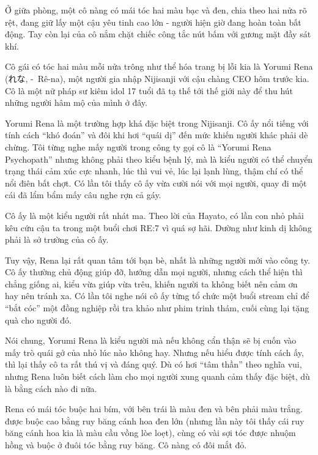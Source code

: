 \documentclass[../main.tex]{subfiles}
\begin{document}
Ở giữa phòng, một cô nàng có mái tóc hai màu bạc và đen, chia theo hai nửa rõ rệt, đang giữ lấy một cậu yêu tinh cao lớn - người hiện giờ đang hoàn toàn bất động. Tay còn lại của cô nắm chặt chiếc công tắc nút bấm với gương mặt đầy sát khí.

\chrint


Cô gái có tóc hai màu mỗi nửa trông như thể hóa trang bị lỗi kia là Yorumi Rena (れな, -\ Rê-na), một người gia nhập Nijisanji với cậu chàng CEO hôm trước kia. Cô là một nữ pháp sư kiêm idol 17 tuổi đã tạ thế tới thế giới này để thu hút những người hâm mộ của mình ở đây.

Yorumi Rena là một trường hợp khá đặc biệt trong Nijisanji. Cô ấy nổi tiếng với tính cách ``khó đoán'' và đôi khi hơi ``quái dị'' đến mức khiến người khác phải dè chừng. Tôi từng nghe mấy người trong công ty gọi cô là ``Yorumi Rena Psychopath'' nhưng không phải theo kiểu bệnh lý, mà là kiểu người có thể chuyển trạng thái cảm xúc cực nhanh, lúc thì vui vẻ, lúc lại lạnh lùng, thậm chí có thể nổi điên bất chợt. Có lần tôi thấy cô ấy vừa cười nói với mọi người, quay đi một cái đã lẩm bẩm mấy câu nghe rợn cả gáy.

Cô ấy là một kiểu người rất nhát ma. Theo lời của Hayato, có lần con nhỏ phải kêu cứu cậu ta trong một buổi chơi RE:7 vì quá sợ hãi. Dường như kinh dị không phải là sở trường của cô ấy.

Tuy vậy, Rena lại rất quan tâm tới bạn bè, nhất là những người mới vào công ty. Cô ấy thường chủ động giúp đỡ, hướng dẫn mọi người, nhưng cách thể hiện thì chẳng giống ai, kiểu vừa giúp vừa trêu, khiến người ta không biết nên cảm ơn hay nên tránh xa. Có lần tôi nghe nói cô ấy từng tổ chức một buổi stream chỉ để ``bắt cóc'' một đồng nghiệp rồi tra khảo như phim trinh thám, cuối cùng lại tặng quà cho người đó.

Nói chung, Yorumi Rena là kiểu người mà nếu không cẩn thận sẽ bị cuốn vào mấy trò quái gở của nhỏ lúc nào không hay. Nhưng nếu hiểu được tính cách ấy, thì lại thấy cô ta rất thú vị và đáng quý. Dù có hơi ``tâm thần'' theo nghĩa vui, nhưng Rena luôn biết cách làm cho mọi người xung quanh cảm thấy đặc biệt, dù là bằng cách nào đi nữa.

Rena có mái tóc buộc hai bím, với bên trái là màu đen và bên phải màu trắng. được buộc cao bằng ruy băng cánh hoa đen lớn (nhưng lần này tôi thấy cái ruy băng cánh hoa kia là màu cầu vồng lòe loẹt), cùng có vài sợi tóc được nhuộm hồng và buộc ở đuôi tóc bằng ruy băng. Cô nàng có đôi mắt đỏ.
\end{document}
